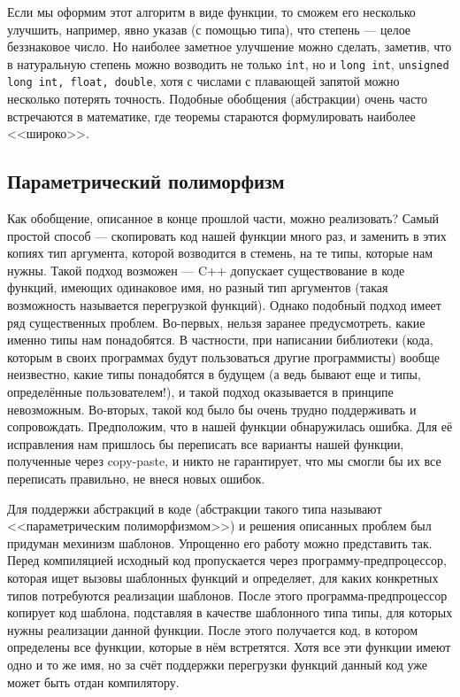 \documentclass{book}
\begin{document}
Если мы оформим этот алгоритм в виде функции, то сможем его несколько улучшить, например, явно
указав (с помощью типа), что степень --- целое беззнаковое число. Но наиболее заметное улучшение
можно сделать, заметив, что в натуральную степень можно возводить не только \texttt{int},
но и \texttt{long int}, \texttt{unsigned long int, float, double}, хотя с числами
с плавающей запятой можно несколько потерять точность. Подобные обобщения (абстракции) очень часто
встречаются в математике, где теоремы стараются формулировать наиболее <<широко>>.

\subsection{Параметрический полиморфизм}

Как обобщение, описанное в конце прошлой части, можно реализовать? Самый простой способ ---
скопировать код нашей функции много раз, и заменить в этих копиях тип аргумента, которой возводится
в стемень, на те типы, которые нам нужны. Такой подход возможен --- C++ допускает существование в
коде функций, имеющих одинаковое имя, но разный тип аргументов (такая возможность называется
перегрузкой функций). Однако подобный подход имеет ряд существенных проблем. Во-первых, нельзя
заранее предусмотреть, какие именно типы нам понадобятся. В частности, при написании библиотеки
(кода, которым в своих программах будут пользоваться другие программисты) вообще неизвестно, какие
типы понадобятся в будущем (а ведь бывают еще и типы, определённые пользователем!), и такой подход
оказывается в принципе невозможным. Во-вторых, такой код было бы очень трудно поддерживать и
сопровождать. Предположим, что в нашей функции обнаружилась ошибка. Для её исправления нам пришлось
бы переписать все варианты нашей функции, полученные через copy-paste, и никто не гарантирует, что
мы смогли бы их все переписать правильно, не внеся новых ошибок.

Для поддержки абстракций в коде (абстракции такого типа называют <<параметрическим полиморфизмом>>)
и решения описанных проблем был придуман мехинизм шаблонов. Упрощенно его работу можно представить
так. Перед компиляцией исходный код пропускается через программу-предпроцессор, которая ищет вызовы
шаблонных функций и определяет, для каких конкретных типов потребуются реализации шаблонов. После
этого программа-предпроцессор копирует код шаблона, подставляя в качестве шаблонного типа типы, для
которых нужны реализации данной функции. После этого получается код, в котором определены все
функции, которые в нём встретятся. Хотя все эти функции имеют одно и то же имя, но за счёт
поддержки перегрузки функций данный код уже может быть отдан компилятору.
\end{document}
